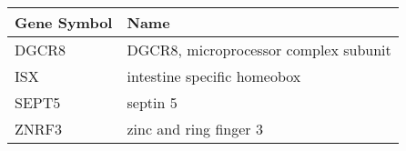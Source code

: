\begin{tabular}{ll}
\toprule
Gene Symbol &                                  Name \\
\midrule
      DGCR8 & DGCR8, microprocessor complex subunit \\
        ISX &           intestine specific homeobox \\
      SEPT5 &                              septin 5 \\
      ZNRF3 &                zinc and ring finger 3 \\
\bottomrule
\end{tabular}

